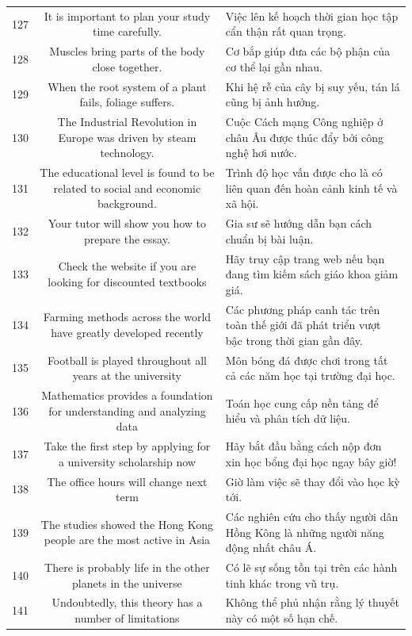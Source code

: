 \documentclass[11pt,a4paper]{article}
\begin{document}
\begin{longtable}{N S M}
127 & It is important to plan your study time carefully. & Việc lên kế hoạch thời gian học tập cẩn thận rất quan trọng. \\
128 & Muscles bring parts of the body close together. & Cơ bắp giúp đưa các bộ phận của cơ thể lại gần nhau. \\
129 & When the root system of a plant fails, foliage suffers. & Khi hệ rễ của cây bị suy yếu, tán lá cũng bị ảnh hưởng. \\
130 & The Industrial Revolution in Europe was driven by steam technology. & Cuộc Cách mạng Công nghiệp ở châu Âu được thúc đẩy bởi công nghệ hơi nước. \\
131 & The educational level is found to be related to social and economic background. & Trình độ học vấn được cho là có liên quan đến hoàn cảnh kinh tế và xã hội. \\
132 & Your tutor will show you how to prepare the essay. & Gia sư sẽ hướng dẫn bạn cách chuẩn bị bài luận. \\
133 & Check the website if you are looking for discounted textbooks & Hãy truy cập trang web nếu bạn đang tìm kiếm sách giáo khoa giảm giá. \\
134 & Farming methods across the world have greatly developed recently & Các phương pháp canh tác trên toàn thế giới đã phát triển vượt bậc trong thời gian gần đây. \\
135 & Football is played throughout all years at the university & Môn bóng đá được chơi trong tất cả các năm học tại trường đại học. \\
136 & Mathematics provides a foundation for understanding and analyzing data & Toán học cung cấp nền tảng để hiểu và phân tích dữ liệu. \\
137 & Take the first step by applying for a university scholarship now & Hãy bắt đầu bằng cách nộp đơn xin học bổng đại học ngay bây giờ! \\
138 & The office hours will change next term & Giờ làm việc sẽ thay đổi vào học kỳ tới. \\
139 & The studies showed the Hong Kong people are the most active in Asia & Các nghiên cứu cho thấy người dân Hồng Kông là những người năng động nhất châu Á. \\
140 & There is probably life in the other planets in the universe & Có lẽ sự sống tồn tại trên các hành tinh khác trong vũ trụ. \\
141 & Undoubtedly, this theory has a number of limitations & Không thể phủ nhận rằng lý thuyết này có một số hạn chế. \\

\end{longtable}
\end{document}
